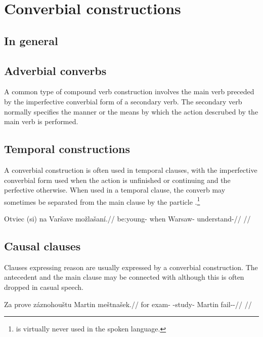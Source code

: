 \section{Converbial constructions}\label{converbs-syntax}

\subsection{In general}

\subsection{Adverbial converbs}

A common type of compound verb construction involves the main verb preceded by the imperfective converbial form of a secondary verb. The secondary verb normally specifies the manner or the means by which the action descrubed by the main verb is performed.


\subsection{Temporal constructions}

A converbial construction is often used in temporal clauses, with the imperfective converbial form used when the action is unfinished or continuing and the perfective otherwise. When used in a temporal clause, the converb may sometimes be separated from the main clause by the particle .\footnote{ is virtually never used in the spoken language.}

\pex
\begingl
\gla Otviec (si) na Varšave možlašaní.//
\glb be:young- when \Loc{} Warsaw-\Pat{} understand-//
\glft {}//
\endgl
\xe

\subsection{Causal clauses}

Clauses expressing reason are usually expressed by a converbial construction. The antecedent and the main clause may be connected with  although this is often dropped in casual speech.

\pex
\begingl
\gla Za prove záznohouštu Martin meštnašek.//
\glb for exam-\Pat{} \Neg{}-study- Martin fail-\Av{}-\Pf{}//
\glft {}//
\endgl
\xe


